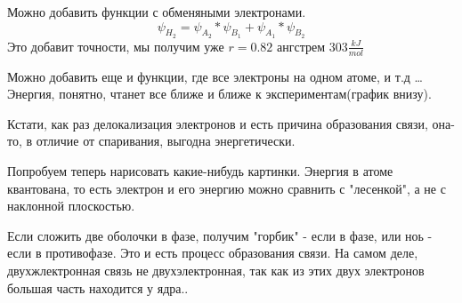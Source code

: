 \documentclass[11pt]{article}
\begin{document}
Можно добавить функции с обменяными электронами.
$$\psi_{H_2} = \psi_{A_2}*\psi_{B_1} + \psi_{A_1}*\psi_{B_2} $$
 Это добавит точности, мы получим уже $r=0.82$ ангстрем $303 \frac{kJ}{mol}$

Можно добавить еще и функции, где все электроны на одном атоме, и т.д \ldots Энергия, понятно, чтанет все ближе и ближе к экспериментам(график внизу).

Кстати, как раз делокализация электронов и есть причина образования связи, она-то, в отличие от спаривания, выгодна энергетически.

Попробуем теперь нарисовать какие-нибудь картинки. Энергия в атоме квантована, то есть электрон и его энергию можно сравнить с "лесенкой",  а не с наклонной плоскостью.

Если сложить две оболочки в фазе, получим "горбик" - если в фазе, или ноь - если в противофазе. Это и есть процесс образования связи. На самом деле, двухжлектронная связь не двухэлектронная, так как из этих двух электронов большая часть находится у ядра..
\end{document}
